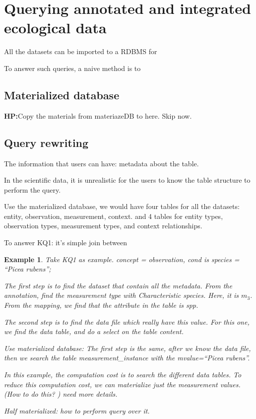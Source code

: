 \documentclass[conference]{IEEEtran}
\newtheorem{example}{Example}[section]
\begin{document}
\section{Querying annotated and integrated ecological data}

All the datasets can be imported to a RDBMS for 

To answer such queries, a naive method is to 

\subsection{Materialized database}


{\bf HP:}{Copy the materials from materiazeDB to here. Skip now.}

\subsection{Query rewriting}


The information that users can have: metadata about the table. 

In the scientific data, it is unrealistic for the users to know the
table structure to perform the query. 

Use the materialized database, we would have four tables for all the datasets: 
entity, observation, measurement, context. 
and 4 tables for entity types, observation types, measurement types,
and context relationships.

To answer KQ1: it's simple join between 

\begin{example}
Take KQ1 as example. 
concept = observation, cond is {\em species = ``Picea rubens''}; 

The first step is to find the dataset that contain all the metadata. 
From the annotation, find the {\em measurement type} with {\em
  Characteristic} species. 
Here, it is $m_3$. From the mapping, we find that the attribute in the
table is {\em spp}. 

The second step is to find the data file which really have this
value. 
For this one, we find the data table, and do a select on the table
content. 

Use materialized database: 
The first step is the same, after we know the data file, then we
search the table {\em measurement\_instance} with the {\em mvalue=``Picea rubens''}. 

In this example, the computation cost is to search the different data
tables. To reduce this computation cost, we can materialize just the
measurement values. (How to do this? ) need more details. 

Half materialized: how to perform query over it. 
\end{example}
\end{document}
